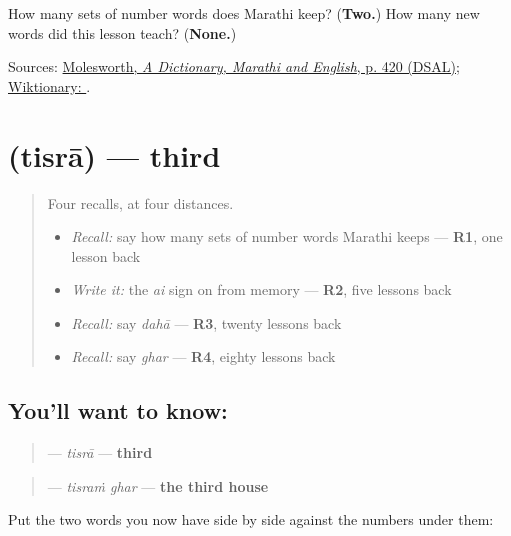\begin{tcolorbox}[breakable,colback=teal!4,colframe=teal!35!black,title={Before you move on}]
How many sets of number words does Marathi keep? (\textbf{Two.}) How many new words did this lesson teach? (\textbf{None.})

Sources: \href{https://dsal.uchicago.edu/cgi-bin/app/molesworth\_query.py?qs=\%E0\%A4\%A6\%E0\%A5\%81\%E0\%A4\%B8\%E0\%A4\%B0\%E0\%A4\%BE\&searchhws=yes}{Molesworth, \emph{A Dictionary, Marathi and English}, p. 420 (DSAL)}; \href{https://en.wiktionary.org/wiki/\%E0\%A4\%A6\%E0\%A5\%81\%E0\%A4\%B8\%E0\%A4\%B0\%E0\%A4\%BE}{Wiktionary: }.
\end{tcolorbox}
\section[\texorpdfstring{\mr{तिसरा} (tisrā)}{तिसरा (tisrā)}]{ (tisrā) — third}

\label{lesson:MR-C60-tisra}



\begin{quote}
Four recalls, at four distances.

\begin{itemize}
\raggedright
  \item \emph{Recall:} say how many sets of number words Marathi keeps — \textbf{R1}, one lesson back
  \item \emph{Write it:} the \emph{ai} sign on \textbf{} from memory — \textbf{R2}, five lessons back
  \item \emph{Recall:} say \emph{dahā} — \textbf{R3}, twenty lessons back
  \item \emph{Recall:} say \emph{ghar} — \textbf{R4}, eighty lessons back
\end{itemize}
\end{quote}

\subsection*{You'll want to know: }
\begin{quote}
\textbf{} — \emph{tisrā} — \textbf{third}
\end{quote}

\begin{quote}
\textbf{ } — \emph{tisraṁ ghar} — \textbf{the third house}
\end{quote}

Put the two words you now have side by side against the numbers under them:

